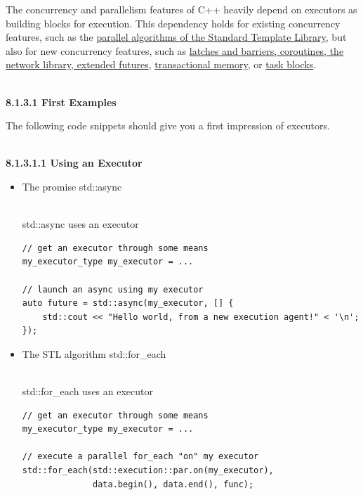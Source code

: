 The concurrency and parallelism features of C++ heavily depend on executors as building blocks for execution. This dependency holds for existing concurrency features, such as the \href{https://www.modernescpp.com/index.php/parallel-algorithm-of-the-standard-template-library}{parallel algorithms of the Standard Template Library}, but also for new concurrency features, such as \href{https://www.modernescpp.com/index.php/std-future-extensions}{latches and barriers, coroutines, the network library, extended futures}, \href{https://www.modernescpp.com/index.php/transactional-memory}{transactional memory}, or \href{https://www.modernescpp.com/index.php/task-blocks}{task blocks}.

\hspace*{\fill} \\ %
\noindent
\textbf{8.1.3.1\hspace{0.2cm} First Examples}

The following code snippets should give you a first impression of executors.

\hspace*{\fill} \\ %
\noindent
\textbf{8.1.3.1.1\hspace{0.2cm} Using an Executor}

\begin{itemize}
\item 
The promise std::async

\hspace*{\fill} \\ %
\noindent
std::async uses an executor
\begin{lstlisting}[style=styleCXX]
// get an executor through some means
my_executor_type my_executor = ...

// launch an async using my executor
auto future = std::async(my_executor, [] {
	std::cout << "Hello world, from a new execution agent!" < '\n';
});
\end{lstlisting}

\item 
The STL algorithm std::for\_each

\hspace*{\fill} \\ %
\noindent
std::for\_each uses an executor
\begin{lstlisting}[style=styleCXX]
// get an executor through some means
my_executor_type my_executor = ...

// execute a parallel for_each "on" my executor
std::for_each(std::execution::par.on(my_executor),
			  data.begin(), data.end(), func);
\end{lstlisting}
\end{itemize}

